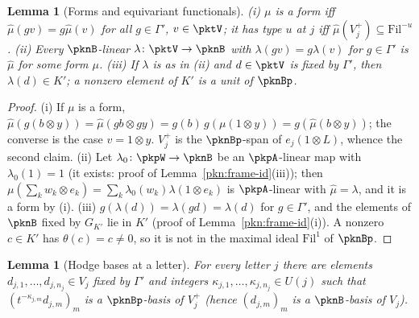 \documentclass[10pt]{amsart}
\newtheorem{lemma}[theorem]{Lemma}
\theoremstyle{definition}
\theoremstyle{remark}
\begin{document}
\begin{lemma}[Forms and equivariant functionals]\label{pkt:forms}
(i) $\mu$ is a form iff $\hat\mu(gv)=g\hat\mu(v)$ for all $g\in\Gamma'$, $v\in\pktV$; it has type $u$ at
$j$ iff $\hat\mu(V_j^+)\subseteq\mathrm{Fil}^{-u}$. (ii) Every $\pknB$-linear $\lambda\colon\pktV\to\pknB$
with $\lambda(gv)=g\lambda(v)$ for $g\in\Gamma'$ is $\hat\mu$ for some form $\mu$. (iii) If $\lambda$ is as
in (ii) and $d\in\pktV$ is fixed by $\Gamma'$, then $\lambda(d)\in K'$; a nonzero element of $K'$ is a
unit of $\pknBp$.
\end{lemma}

\begin{proof}
(i) If $\mu$ is a form, $\hat\mu(g(b\otimes y))=\hat\mu(gb\otimes gy)=g(b)\,g(\mu(1\otimes y))=
g(\hat\mu(b\otimes y))$; the converse is the case $v=1\otimes y$. $V_j^+$ is the $\pknBp$-span of
$e_j(1\otimes L)$, whence the second claim. (ii) Let $\lambda_0\colon\pkpW\to\pknB$ be an $\pkpA$-linear
map with $\lambda_0(1)=1$ (it exists: proof of Lemma~\ref{pkn:frame-id}(iii)); then
$\mu(\sum_kw_k\otimes e_k)=\sum_k\lambda_0(w_k)\lambda(1\otimes e_k)$ is $\pkpA$-linear with $\hat\mu=
\lambda$, and it is a form by (i). (iii) $g(\lambda(d))=\lambda(gd)=\lambda(d)$ for $g\in\Gamma'$, and the
elements of $\pknB$ fixed by $G_{K'}$ lie in $K'$ (proof of Lemma~\ref{pkn:frame-id}(i)). A nonzero
$c\in K'$ has $\theta(c)=c\ne0$, so it is not in the maximal ideal $\mathrm{Fil}^1$ of $\pknBp$.
\end{proof}

\begin{lemma}[Hodge bases at a letter]\label{pkt:hodge}
For every letter $j$ there are elements $d_{j,1},\dots,d_{j,n_j}\in V_j$ fixed by $\Gamma'$ and integers
$\kappa_{j,1},\dots,\kappa_{j,n_j}\in U(j)$ such that $(t^{-\kappa_{j,m}}d_{j,m})_m$ is a $\pknBp$-basis of
$V_j^+$ (hence $(d_{j,m})_m$ is a $\pknB$-basis of $V_j$).
\end{lemma}
\end{document}
